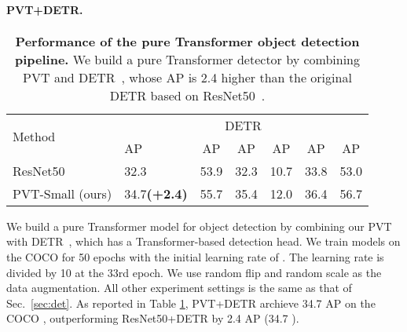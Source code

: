 \documentclass[10pt,twocolumn,letterpaper]{article}
\newlength\savedwidth
\newcommand\whline{\noalign{\global\savedwidth\arrayrulewidth\global\arrayrulewidth 0.8pt}\hline\noalign{\global\arrayrulewidth\savedwidth}}
\newcommand{\green}[1]{\textcolor[RGB]{96,177,87}{#1}}
\newcommand{\fn}[1]{\footnotesize{#1}}
\newcommand{\gbf}[1]{\green{\bf{\fn{(#1)}}}}
\begin{document}
\paragraph{PVT+DETR.}
\begin{table}[t]
    \centering
\setlength{\tabcolsep}{0.6mm}
    \begin{tabular}{l|lcc|ccc}
\multirow{2}{*}{Method} & \multicolumn{6}{c}{DETR}\\
	\cline{2-7}
 &AP &AP &AP &AP &AP &AP  \\
	\whline
	ResNet50 & 32.3 & 53.9 & 32.3 & 10.7 & 33.8 & 53.0  \\
\rowcolor{mygray}
	PVT-Small (ours) & 34.7\gbf{+2.4} & 55.7 & 35.4 & 12.0 & 36.4 & 56.7 \\
\end{tabular}     \caption{\textbf{Performance of the pure Transformer object detection pipeline.} We build a pure Transformer detector by combining PVT and DETR~\cite{carion2020end}, whose AP is 2.4 higher than the original DETR based on ResNet50~\cite{he2016deep}.}
    \label{tab:detr}
\end{table}
We build a pure Transformer model for object detection by combining our PVT with DETR~\cite{carion2020end}, which has a Transformer-based detection head. We train models on the COCO  for 50 epochs with the initial learning rate of . The learning rate is divided by 10 at the 33rd epoch. We use random flip and random scale as the data augmentation. All other experiment settings is the same as that of Sec.~\ref{sec:det}. As reported in Table \ref{tab:detr}, PVT+DETR archieve 34.7 AP on the COCO , outperforming ResNet50+DETR by 2.4 AP (34.7 ).
\end{document}
